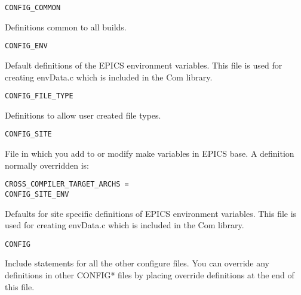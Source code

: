 \begin{description}
\end{description}\begin{verbatim}CONFIG_COMMON
\end{verbatim}\begin{description}\item Definitions common to all builds.

\end{description}\begin{verbatim}CONFIG_ENV
\end{verbatim}\begin{description}\item Default definitions of the EPICS environment variables. This file is used for creating envData.c which is included 
in the Com library.

\end{description}\begin{verbatim}CONFIG_FILE_TYPE
\end{verbatim}\begin{description}\item Definitions to allow user created file types.

\end{description}\begin{verbatim}CONFIG_SITE
\end{verbatim}\begin{description}\item File in which you add to or modify make variables in EPICS base. A definition normally overridden is:

\end{description}\begin{verbatim}CROSS_COMPILER_TARGET_ARCHS =
CONFIG_SITE_ENV
\end{verbatim}\begin{description}\item Defaults for site specific definitions of EPICS environment variables. This file is used for creating envData.c 
which is included in the Com library.

\end{description}\begin{verbatim}CONFIG
\end{verbatim}\begin{description}\item Include statements for all the other configure files. You can override any definitions in other CONFIG* files by 
placing override definitions at the end of this file.


\end{description}
